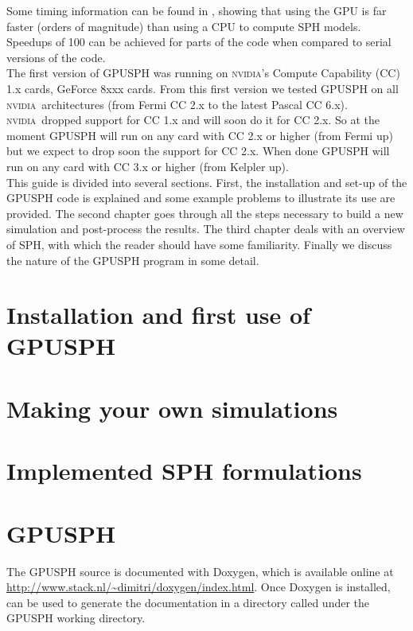 \documentclass[12pt]{memoir}
\newcommand{\nvidia}{\textsc{nvidia}}
\begin{document}
Some timing information can be found in \cite{herault_sph_2010}, 
showing that using the GPU is far faster (orders
of magnitude) than using a CPU to compute SPH models. Speedups of 100
can be achieved for parts of the code when compared to serial versions
of the code.\\

The first version of GPUSPH was running  on \nvidia's Compute Capability (CC) 1.x cards, 
GeForce 8xxx cards. From this first version we tested GPUSPH on all \nvidia \  architectures
(from Fermi CC 2.x to the latest Pascal CC 6.x). \nvidia \  dropped support for CC 1.x and will 
soon do it for CC 2.x. So at the moment GPUSPH will run on any card with CC 2.x or higher
(from Fermi up) but we expect to drop soon the support for CC 2.x. When done GPUSPH will
run on any card with CC 3.x or higher (from Kelpler up).\\

This guide is divided into several sections. 
First, the installation and set-up of the GPUSPH code is explained and 
some example problems to illustrate its use are provided.
The second chapter goes through all the steps necessary to build a new
simulation and post-process the results.
The third chapter deals with an overview of SPH, with which the reader should
have some familiarity. 
Finally we discuss the nature of the GPUSPH program in some detail.

\chapter{Installation and first use of GPUSPH}


\chapter{Making your own simulations}


\chapter{Implemented SPH formulations}


\iffalse
\chapter{GPUSPH}

The GPUSPH source is documented with Doxygen, which is available online
at \url{http://www.stack.nl/~dimitri/doxygen/index.html}. Once Doxygen
is installed,  can be used to generate the documentation
in a directory called  under the GPUSPH working directory.
\end{document}
